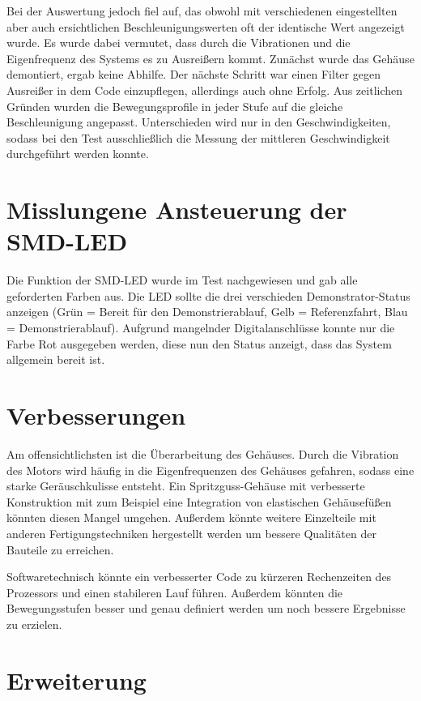 Bei der Auswertung jedoch fiel auf, das obwohl mit verschiedenen eingestellten aber auch ersichtlichen Beschleunigungswerten oft der identische Wert angezeigt wurde. Es wurde dabei vermutet, dass durch die Vibrationen und die Eigenfrequenz des Systems es zu Ausreißern kommt. Zunächst wurde das Gehäuse demontiert, ergab keine Abhilfe. Der nächste Schritt war einen Filter gegen Ausreißer in dem Code einzupflegen, allerdings auch ohne Erfolg. 
Aus zeitlichen Gründen wurden die Bewegungsprofile in jeder Stufe auf die gleiche Beschleunigung angepasst. Unterschieden wird nur in den Geschwindigkeiten, sodass bei den Test ausschließlich die Messung der mittleren Geschwindigkeit durchgeführt werden konnte.    

\section{Misslungene Ansteuerung der SMD-LED}

Die Funktion der SMD-LED wurde im Test nachgewiesen und gab alle geforderten Farben aus. Die LED sollte die drei verschieden Demonstrator-Status anzeigen (Grün = Bereit für den Demonstrierablauf, Gelb = Referenzfahrt, Blau = Demonstrierablauf). Aufgrund mangelnder Digitalanschlüsse konnte nur die Farbe Rot ausgegeben werden, diese nun den Status anzeigt, dass das System allgemein bereit ist.  

\section{Verbesserungen}

Am offensichtlichsten ist die Überarbeitung des Gehäuses. Durch die Vibration des Motors wird häufig in die Eigenfrequenzen des Gehäuses gefahren, sodass eine starke Geräuschkulisse entsteht. Ein Spritzguss-Gehäuse mit verbesserte Konstruktion mit zum Beispiel eine Integration von elastischen Gehäusefüßen könnten diesen Mangel umgehen. Außerdem könnte weitere Einzelteile mit anderen Fertigungstechniken hergestellt werden um bessere Qualitäten der Bauteile zu erreichen.

Softwaretechnisch könnte ein verbesserter Code zu kürzeren Rechenzeiten des Prozessors und einen stabileren Lauf führen. Außerdem könnten die Bewegungsstufen besser und genau definiert werden um noch bessere Ergebnisse zu erzielen.   


\section{Erweiterung}

